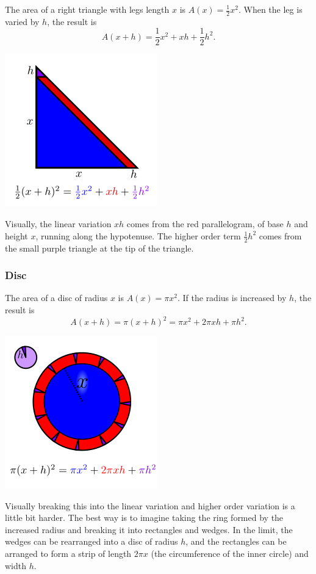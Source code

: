 \documentclass[twoside,openright,titlepage,a4paper]{book}
\begin{document}
\begin{sloppypar}
The area of a right triangle with legs length $x$ is $A(x) = \frac{1}{2}x^2$. When the leg is varied by $h$, the result is \[ A(x+h) = \frac{1}{2}x^2 + xh + \frac{1}{2}h^2. \]
\begin{center}\includegraphics[scale=0.6]{TriangleVariation}\end{center}

Visually, the linear variation $xh$ comes from the red parallelogram, of base $h$ and height $x$, running along the hypotenuse. The higher order term $\frac{1}{2}h^2$ comes from the small purple triangle at the tip of the triangle.

\subsubsection{Disc}

The area of a disc of radius $x$ is $A(x) = \pi x^2$. If the radius is increased by $h$, the result is \[ A(x+h) = \pi (x+h)^2 = \pi x^2 + 2\pi x h + \pi h^2. \]
\begin{center}\includegraphics[scale=0.6]{CircleVariation}\end{center}

Visually breaking this into the linear variation and higher order variation is a little bit harder. The best way is to imagine taking the ring formed by the increased radius and breaking it into rectangles and wedges. In the limit, the wedges can be rearranged into a disc of radius $h$, and the rectangles can be arranged to form a strip of length $2\pi x$ (the circumference of the inner circle) and width $h$.


\end{sloppypar}
\end{document}
